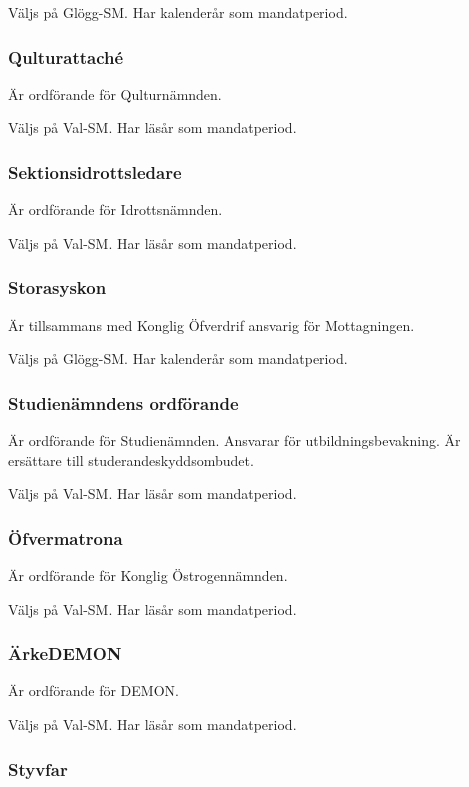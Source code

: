 \documentclass{dgovdoc}
\begin{document}
Väljs på Glögg-SM. Har kalenderår som mandatperiod.

\subsubsection{Qulturattaché}

Är ordförande för Qulturnämnden.

Väljs på Val-SM. Har läsår som mandatperiod.

\subsubsection{Sektionsidrottsledare}

Är ordförande för Idrottsnämnden.

Väljs på Val-SM. Har läsår som mandatperiod.

\subsubsection{Storasyskon}

Är tillsammans med Konglig Öfverdrif ansvarig för Mottagningen.

Väljs på Glögg-SM. Har kalenderår som mandatperiod.

\subsubsection{Studienämndens ordförande}

Är ordförande för Studienämnden. Ansvarar för utbildningsbevakning. Är
ersättare till studerandeskyddsombudet.

Väljs på Val-SM. Har läsår som mandatperiod.

\subsubsection{Öfvermatrona}

Är ordförande för Konglig Östrogennämnden.

Väljs på Val-SM. Har läsår som mandatperiod.

\subsubsection{ÄrkeDEMON}

Är ordförande för DEMON.

Väljs på Val-SM. Har läsår som mandatperiod.

\subsubsection{Styvfar}
\end{document}
